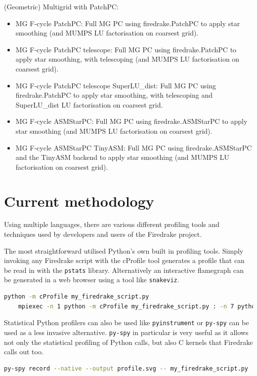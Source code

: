 \documentclass[a4paper,11pt]{article}
\begin{document}
\noindent(Geometric) Multigrid with PatchPC:
\begin{itemize}
	\item MG F-cycle PatchPC: Full MG PC using firedrake.PatchPC to apply star smoothing (and MUMPS LU factorisation on coarsest grid).
    \item MG F-cycle PatchPC telescope: Full MG PC using firedrake.PatchPC to apply star smoothing, with telescoping (and MUMPS LU factorisation on coarsest grid).
    \item MG F-cycle PatchPC telescope SuperLU\_dist: Full MG PC using firedrake.PatchPC to apply star smoothing, with telescoping and SuperLU\_dist LU factorisation on coarsest grid.
    \item MG F-cycle ASMStarPC: Full MG PC using firedrake.ASMStarPC to apply star smoothing (and MUMPS LU factorisation on coarsest grid).
    \item MG F-cycle ASMStarPC TinyASM: Full MG PC using firedrake.ASMStarPC and the TinyASM backend to apply star smoothing (and MUMPS LU factorisation on coarsest grid).
\end{itemize}
    


\section{Current methodology}
\label{sec:current}
Using multiple languages, there are various different profiling tools and techniques used by developers and users of the Firedrake project.

The most straightforward utilised Python's own built in profiling tools.
Simply invoking any Firedrake script with the cProfile tool generates a profile that can be read in with the \verb`pstats` library.
Alternatively an interactive flamegraph can be generated in a web browser using a tool like \verb`snakeviz`.
\begin{lstlisting}[language=bash]
	python -m cProfile my_firedrake_script.py
	mpiexec -n 1 python -m cProfile my_firedrake_script.py : -n 7 python my_firedrake_script.py
\end{lstlisting}

Statistical Python profilers can also be used like \verb`pyinstrument` or \verb`py-spy` can be used as a less invasive alternative.
\verb`py-spy` in particular is very useful as it allows not only the statistical profiling of Python calls, but also C kernels that Firedrake calls out too.
\begin{lstlisting}[language=bash]
    py-spy record --native --output profile.svg -- my_firedrake_script.py
\end{lstlisting}
\end{document}
